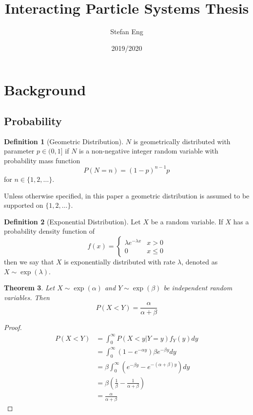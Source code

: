 \documentclass{article}
\title{Interacting Particle Systems Thesis}
\author{Stefan Eng}
\date{2019/2020}
\theoremstyle{plain}
\newtheorem{theorem}{Theorem}[section]
\theoremstyle{definition}
\newtheorem{defn}[theorem]{Definition}
\theoremstyle{remark}
\numberwithin{equation}{section}
\begin{document}
\maketitle

\tableofcontents

\section{Background}

\subsection{Probability}

\begin{defn}[Geometric Distribution]
$N$ is geometrically distributed with parameter $p \in (0,1]$ if $N$ is a non-negative integer random variable with probability mass function
$$
P(N = n) = (1 - p)^{n - 1} p
$$
for $n \in \{1,2,\ldots\}$.

Unless otherwise specified, in this paper a geometric distribution is assumed to be supported on $\{1,2,\ldots\}$.
\end{defn}

\begin{defn}[Exponential Distribution]
Let $X$ be a random variable.
If $X$ has a probability density function of
$$
f(x) = \begin{cases}
    \lambda e^{-\lambda x} & x > 0\\
    0 & x \leq 0
    \end{cases}
$$
then we say that $X$ is exponentially distributed with rate $\lambda$, denoted as $X \sim \exp(\lambda)$.
\end{defn}

\begin{theorem}\label{thm:exp_x_less_y}
Let $X \sim \exp(\alpha)$ and $Y \sim \exp(\beta)$ be independent random variables.
Then
$$
P(X < Y) = \frac{\alpha}{\alpha + \beta}
$$
\end{theorem}

\begin{proof}
\begin{align*}
    P(X < Y) &= \int_0^\infty P(X < y | Y = y) f_Y(y) dy\\
    &= \int_0^\infty (1 - e^{-\alpha y}) \beta e^{-\beta y} dy\\
    &= \beta \int_0^\infty \left( e^{-\beta y} - e^{-(\alpha + \beta) y}\right) dy\\
    &= \beta \left(\frac{1}{\beta} - \frac{1}{\alpha + \beta}\right)\\
    &= \frac{\alpha}{\alpha + \beta}
\end{align*}
\end{proof}
\end{document}
